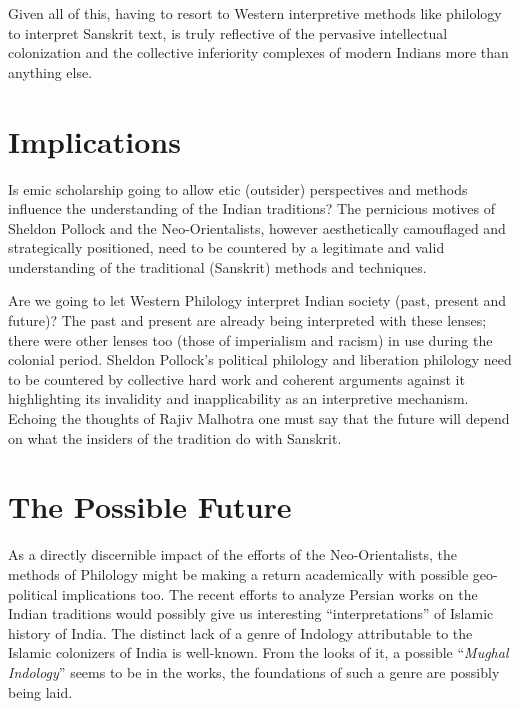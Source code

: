 Given all of this, having to resort to Western interpretive methods like philology to interpret Sanskrit text, is truly reflective of the pervasive intellectual colonization and the collective inferiority complexes of modern Indians more than anything else.


\section*{Implications}

\vskip -7pt

Is emic scholarship going to allow etic (outsider) perspectives and methods influence the understanding of the Indian traditions? The pernicious motives of Sheldon Pollock and the Neo-Orientalists, however aesthetically camouflaged and strategically positioned, need to be countered by a legitimate and valid understanding of the traditional (Sanskrit) methods and techniques.

Are we going to let Western Philology interpret Indian society (past, present and future)? The past and present are already being interpreted with these lenses; there were other lenses too (those of imperialism and racism) in use during the colonial period. Sheldon Pollock’s political philology and liberation philology need to be countered by collective hard work and coherent arguments against it highlighting its invalidity and inapplicability as an interpretive mechanism. Echoing the thoughts of Rajiv Malhotra one must say that the future will depend on what the insiders of the tradition do with Sanskrit.

\vskip -6pt


\section*{The Possible Future}

As a directly discernible impact of the efforts of the Neo-Orientalists, the methods of Philology might be making a return academically with possible geo-political implications too. The recent efforts to analyze Persian works on the Indian traditions would possibly give us interesting “interpretations” of Islamic history of India. The distinct lack of a genre of Indology attributable to the Islamic colonizers of India is well-known. From the looks of it, a possible “\textit{Mughal Indology}” seems to be in the works, the foundations of such a genre are possibly being laid.

